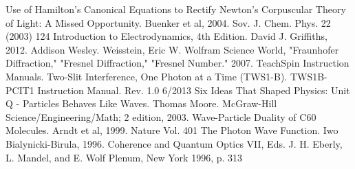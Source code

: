 \documentclass[prb,preprint]{revtex4-1}
\begin{document}
\begin{thebibliography}{3}
 Use of Hamilton's Canonical Equations to Rectify Newton's Corpuscular Theory of Light:  A Missed Opportunity.  Buenker et al, 2004.  Sov. J. Chem. Phys. 22 (2003) 124
 Introduction to Electrodynamics, 4th Edition.  David J. Griffiths, 2012.  Addison Wesley.
Weisstein, Eric W. Wolfram Science World, "Fraunhofer Diffraction," "Fresnel Diffraction," "Fresnel Number." 2007. 
 TeachSpin Instruction Manuals.  Two-Slit Interference, One Photon at a Time (TWS1-B).  TWS1B-PCIT1 Instruction Manual. Rev. 1.0 6/2013
 Six Ideas That Shaped Physics: Unit Q - Particles Behaves Like Waves.  Thomas Moore.  McGraw-Hill Science/Engineering/Math; 2 edition, 2003.
 Wave-Particle Duality of C60 Molecules.  Arndt et al, 1999.  Nature Vol. 401
The Photon Wave Function.  Iwo Bialynicki-Birula, 1996.  Coherence and Quantum Optics VII, Eds. J. H. Eberly, L. Mandel, and E. Wolf
Plenum, New York 1996, p. 313
\end{thebibliography}
\end{document}
